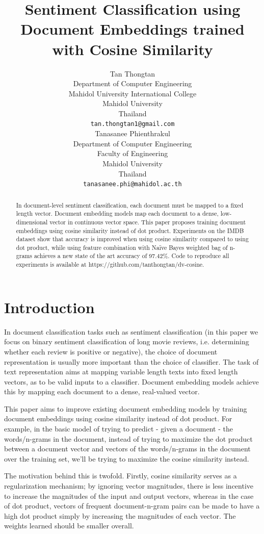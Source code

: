 \documentclass[11pt,a4paper]{article}
\title{Sentiment Classification using Document Embeddings trained with Cosine Similarity}
\author{Tan Thongtan \\
  Department of Computer Engineering \\
  Mahidol University International College \\
  Mahidol University \\
  Thailand \\
  \texttt{tan.thongtan1@gmail.com} \\\And
  Tanasanee Phienthrakul \\
  Department of Computer Engineering \\
  Faculty of Engineering \\
  Mahidol University \\
  Thailand \\
  \texttt{tanasanee.phi@mahidol.ac.th} \\}
\date{}
\begin{document}
\maketitle
\begin{abstract}
In document-level sentiment classification, each document must be mapped to a fixed length vector. Document embedding models map each document to a dense, low-dimensional vector in continuous vector space. This paper proposes training document embeddings using cosine similarity instead of dot product. Experiments on the IMDB dataset show that accuracy is improved when using cosine similarity compared to using dot product, while using feature combination with Naïve Bayes weighted bag of n-grams achieves a new state of the art accuracy of 97.42\%. Code to reproduce all experiments is available at https://github.com/tanthongtan/dv-cosine. 
\end{abstract}

\section{Introduction}



In document classification tasks such as sentiment classification (in this paper we focus on binary sentiment classification of long movie reviews, i.e. determining whether each review is positive or negative), the choice of document representation is usually more important than the choice of classifier. The task of text representation aims at mapping variable length texts into fixed length vectors, as to be valid inputs to a classifier. Document embedding models achieve this by mapping each document to a dense, real-valued vector. 

This paper aims to improve existing document embedding models \cite{le2014,li2016a} by training document embeddings
using cosine similarity instead of dot product. For example, in the basic model of trying to
predict - given a document - the words/n-grams in the document, instead of
trying to maximize the dot product between a document vector
and vectors of the words/n-grams in the document over the training set, we'll be trying to
maximize the cosine similarity instead. 

The motivation behind this is twofold. Firstly, cosine similarity serves as a regularization mechanism; by
ignoring vector magnitudes, there is less incentive to increase the magnitudes of the 
input and output vectors, whereas in the case of dot product, vectors of frequent document-n-gram pairs can be made to have a 
high dot product simply by increasing the magnitudes of each vector. The weights learned should be smaller
overall. 
\end{document}
